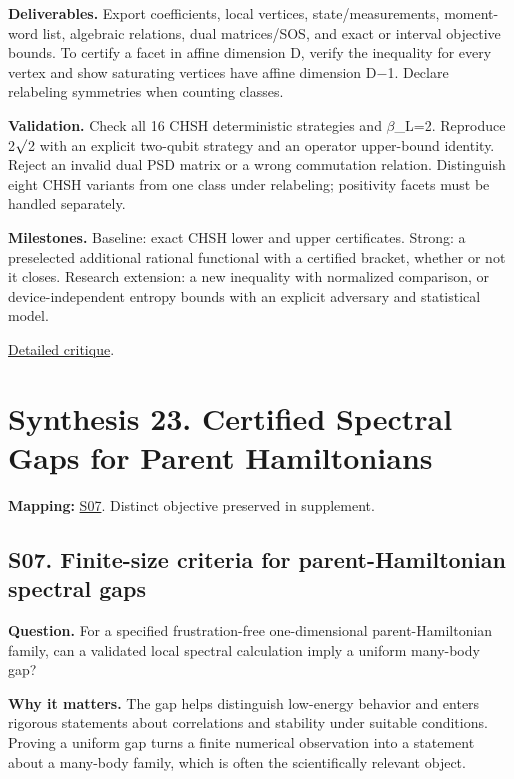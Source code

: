 \documentclass[
  11pt,
]{article}
\begin{document}
\textbf{Deliverables.} Export coefficients, local vertices,
state/measurements, moment-word list, algebraic relations, dual
matrices/SOS, and exact or interval objective bounds. To certify a facet
in affine dimension D, verify the inequality for every vertex and show
saturating vertices have affine dimension D\ensuremath{-}1. Declare
relabeling symmetries when counting classes.

\textbf{Validation.} Check all 16 CHSH deterministic strategies and
\ensuremath{\beta}\_L=2. Reproduce 2\ensuremath{\surd}2 with an explicit
two-qubit strategy and an operator upper-bound identity. Reject an
invalid dual PSD matrix or a wrong commutation relation. Distinguish
eight CHSH variants from one class under relabeling; positivity facets
must be handled separately.

\textbf{Milestones.} Baseline: exact CHSH lower and upper certificates.
Strong: a preselected additional rational functional with a certified
bracket, whether or not it closes. Research extension: a new inequality
with normalized comparison, or device-independent entropy bounds with an
explicit adversary and statistical model.

\href{https://github.com/rick-stevens-ai/Pure-Thought/blob/main/reviews/22-Bell-Inequalities-Nonlocality.md}{Detailed
critique}.

\section{Synthesis 23. Certified Spectral Gaps for Parent Hamiltonians}

\textbf{Mapping:}
\href{https://github.com/rick-stevens-ai/Pure-Thought/blob/main/supplemental/S07.md}{S07}.
Distinct objective preserved in supplement.

\subsection{S07. Finite-size criteria for parent-Hamiltonian spectral
gaps}

\textbf{Question.} For a specified frustration-free one-dimensional
parent-Hamiltonian family, can a validated local spectral calculation
imply a uniform many-body gap?

\textbf{Why it matters.} The gap helps distinguish low-energy behavior
and enters rigorous statements about correlations and stability under
suitable conditions. Proving a uniform gap turns a finite numerical
observation into a statement about a many-body family, which is often
the scientifically relevant object.
\end{document}
